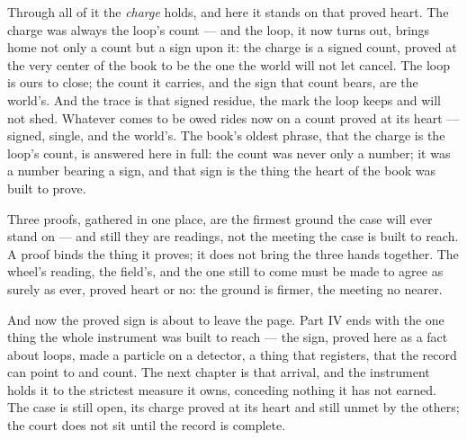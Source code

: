 Through all of it the \emph{charge} holds, and here it stands on that proved heart. The charge was always the
loop's count --- and the loop, it now turns out, brings home not only a count but a sign upon it: the charge is
a signed count, proved at the very center of the book to be the one the world will not let cancel. The loop is
ours to close; the count it carries, and the sign that count bears, are the world's. And the trace is that
signed residue, the mark the loop keeps and will not shed. Whatever comes to be owed rides now on a count proved
at its heart --- signed, single, and the world's. The book's oldest phrase, that the charge is the loop's count,
is answered here in full: the count was never only a number; it was a number bearing a sign, and that sign is
the thing the heart of the book was built to prove.

Three proofs, gathered in one place, are the firmest ground the case will ever stand on --- and still they are
readings, not the meeting the case is built to reach. A proof binds the thing it proves; it does not bring the
three hands together. The wheel's reading, the field's, and the one still to come must be made to agree as
surely as ever, proved heart or no: the ground is firmer, the meeting no nearer.

And now the proved sign is about to leave the page. Part IV ends with the one thing the whole instrument was
built to reach --- the sign, proved here as a fact about loops, made a particle on a detector, a thing that
registers, that the record can point to and count. The next chapter is that arrival, and the instrument holds it
to the strictest measure it owns, conceding nothing it has not earned. The case is still open, its charge proved
at its heart and still unmet by the others; the court does not sit until the record is complete.

